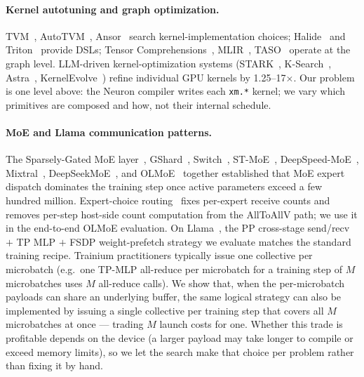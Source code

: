 \paragraph{Kernel autotuning and graph optimization.}
TVM~\cite{chen2018tvm}, AutoTVM~\cite{chen2018autotvm},
Ansor~\cite{zheng2020ansor} search kernel-implementation choices;
Halide~\cite{ragankelley2013halide} and
Triton~\cite{tillet2019triton} provide DSLs;
Tensor Comprehensions~\cite{vasilache2018tc},
MLIR~\cite{lattner2021mlir}, TASO~\cite{jia2019taso} operate at
the graph level. LLM-driven kernel-optimization systems
(STARK~\cite{stark2025}, K-Search~\cite{ksearch2026},
Astra~\cite{astra2025}, KernelEvolve~\cite{kernelevolve2025})
refine individual GPU kernels by 1.25--17$\times$. Our problem
is one level above: the Neuron compiler writes each
\texttt{xm.*} kernel; we vary which primitives are composed and
how, not their internal schedule.

\paragraph{MoE and Llama communication patterns.}
The Sparsely-Gated MoE
layer~\cite{shazeer2017outrageously},
GShard~\cite{lepikhin2021gshard},
Switch~\cite{fedus2022switch}, ST-MoE~\cite{zoph2022stmoe},
DeepSpeed-MoE~\cite{rajbhandari2022dsmoe},
Mixtral~\cite{jiang2024mixtral},
DeepSeekMoE~\cite{dai2024deepseekmoe}, and
OLMoE~\cite{muennighoff2024olmoe} together established that MoE
expert dispatch dominates the training step once active parameters
exceed a few hundred million. Expert-choice
routing~\cite{zhou2022expertchoice} fixes per-expert receive
counts and removes per-step host-side count computation from the
AllToAllV path; we use it in the end-to-end OLMoE evaluation.
On Llama~\cite{touvron2023llama, touvron2023llama2}, the PP
cross-stage send/recv $+$ TP MLP $+$ FSDP weight-prefetch
strategy we evaluate matches the standard training recipe.
Trainium practitioners typically issue one collective per
microbatch (e.g.\ one TP-MLP all-reduce per microbatch for a
training step of $M$ microbatches uses $M$ all-reduce calls).
We show that, when the per-microbatch payloads can share an
underlying buffer, the same logical strategy can also be
implemented by issuing a single collective per training step
that covers all $M$ microbatches at once --- trading $M$
launch costs for one. Whether this trade is profitable depends
on the device (a larger payload may take longer to compile or
exceed memory limits), so we let the search make that choice
per problem rather than fixing it by hand.


